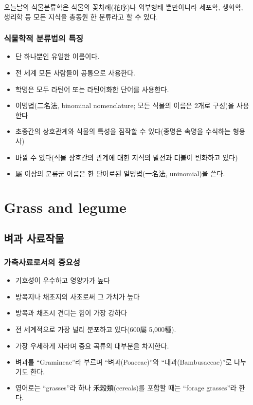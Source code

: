 \documentclass[]{book}
\providecommand{\tightlist}{%
  \setlength{\itemsep}{0pt}\setlength{\parskip}{0pt}}
\begin{document}
오늘날의 식물분류학은 식물의 꽃차례(花序)나 외부형태 뿐만아니라 세포학,
생화학, 생리학 등 모든 지식을 총동원 한 분류라고 할 수 있다.

\subsection{식물학적 분류법의 특징}\label{--}

\begin{itemize}
\tightlist
\item
  단 하나뿐인 유일한 이름이다.
\item
  전 세계 모든 사람들이 공통으로 사용한다.
\item
  학명은 모두 라틴어 또는 라틴어화한 단어를 사용한다.
\item
  이명법(二名法, binominal nomenclature; 모든 식물의 이름은 2개로
  구성)을 사용한다
\item
  초종간의 상호관계와 식물의 특성을 짐작할 수 있다(종명은 속명을
  수식하는 형용사)
\item
  바뀔 수 있다(식물 상호간의 관계에 대한 지식의 발전과 더불어 변화하고
  있다)
\item
  屬 이상의 분류군 이름은 한 단어로된 일명법(一名法, uninomial)을 쓴다.
\end{itemize}

\chapter{Grass and legume}\label{legumeandgrass}

\section{벼과 사료작물}\label{-}

\subsection{가축사료로서의 중요성}\label{-}

\begin{itemize}
\tightlist
\item
  기호성이 우수하고 영양가가 높다
\item
  방목지나 채초지의 사초로써 그 가치가 높다
\item
  방목과 채초시 견디는 힘이 가장 강하다
\item
  전 세계적으로 가장 널리 분포하고 있다(600屬 5,000種).
\item
  가장 우세하게 자라며 중요 곡류의 대부분을 차지한다.
\item
  벼과를 ``Gramineae''라 부르며 ``벼과(Poaceae)''와
  ``대과(Bambusaceae)''로 나누기도 한다.
\item
  영어로는 ``grasses''라 하나 禾穀類(cereals)를 포함할 때는 ``forage
  grasses''라 한다.
\end{itemize}
\end{document}
